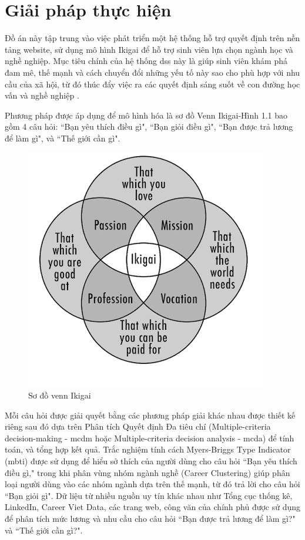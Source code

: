 \section{Giải pháp thực hiện}    
    Đồ án này tập trung vào việc phát triển một hệ thống hỗ trợ quyết định trên nền tảng website, sử dụng mô hình Ikigai để hỗ trợ sinh viên lựa chọn ngành học và nghề nghiệp. Mục tiêu chính của hệ thống \acrshort{dss} này là giúp sinh viên khám phá đam mê, thế mạnh và cách chuyển đổi những yếu tố này sao cho phù hợp với nhu cầu của xã hội, từ đó thúc đẩy việc ra các quyết định sáng suốt về con đường học vấn và nghề nghiệp .

    Phương pháp được áp dụng để mô hình hóa là sơ đồ Venn Ikigai-Hình 1.1 bao gồm 4 câu hỏi: ``Bạn yêu thích điều gì", ``Bạn giỏi điều gì", ``Bạn được trả lương để làm gì", và ``Thế giới cần gì". 
    \begin{figure}[H]
        \centering
        \includegraphics[width=0.5\linewidth]{images/ikigai.png}
        \vspace{0.6cm}
        \caption{Sơ đồ venn Ikigai}
    \end{figure}

    Mỗi câu hỏi được giải quyết bằng các phương pháp giải khác nhau được thiết kế riêng sau đó dựa trên Phân tích Quyết định Đa tiêu chí (Multiple-criteria decision-making - \acrshort{mcdm} hoặc Multiple-criteria decision analysis - \acrshort{mcda}) để tính toán, và tổng hợp kết quả. Trắc nghiệm tính cách Myers-Briggs Type Indicator (\acrshort{mbti}) được sử dụng để hiểu sở thích của người dùng cho câu hỏi ``Bạn yêu thích điều gì," trong khi phân vùng nhóm ngành nghề (Career Clustering) giúp phân loại người dùng vào các nhóm ngành dựa trên thế mạnh, từ đó trả lời cho câu hỏi ``Bạn giỏi gì". Dữ liệu từ nhiều nguồn uy tín khác nhau như Tổng cục thống kê, LinkedIn, Career Viet Data, các trang web, công văn của chính phủ được sử dụng để phân tích mức lương và nhu cầu cho câu hỏi ``Bạn được trả lương để làm gì?" và ``Thế giới cần gì?".
    
